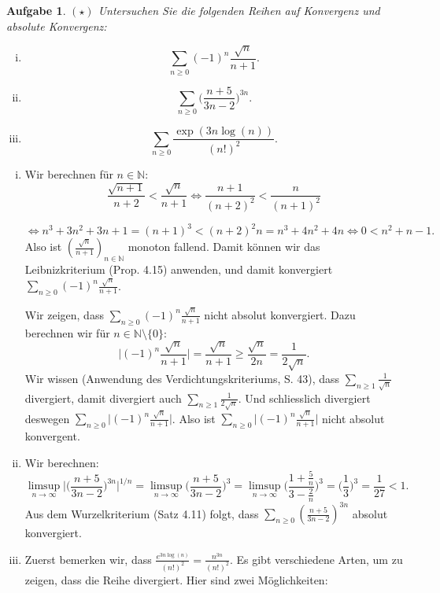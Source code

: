 \documentclass[a4paper, 20]{exam}
\newtheorem{ex}{Aufgabe}
\newcommand\NN{\mathbb{N}}
\begin{document}
 
\begin{ex}{$(\star)$}
Untersuchen Sie die folgenden Reihen auf Konvergenz und absolute Konvergenz:

\begin{enumerate}[i.)]
\item
$$ \sum_{n\geq 0} (-1)^n \frac{\sqrt{n}}{n+1}.$$

\item
$$ \sum_{n\geq 0} \bigg( \frac{n+5}{3n-2} \bigg)^{3n}.$$

\item
$$ \sum_{n\geq 0} \frac{\exp(3n \log(n))}{(n!)^2}.$$
\end{enumerate}
\end{ex}
\begin{solution}
\begin{enumerate}[i.)]
\item
Wir berechnen f\"ur $n\in \NN$:
$$ \frac{\sqrt{n+1}}{n+2} < \frac{\sqrt{n}}{n+1} 
\Longleftrightarrow \frac{n+1}{(n+2)^2} < \frac{n}{(n+1)^2}$$

$$\Longleftrightarrow n^3+3n^2+3n+1= (n+1)^3 < (n+2)^2 n = n^3+4n^2+4n
\Longleftrightarrow 0 < n^2+n-1.$$
Also ist $(\frac{\sqrt{n}}{n+1})_{n \in \NN}$ monoton fallend. Damit k\"onnen wir das Leibnizkriterium (Prop. 4.15) anwenden, und damit konvergiert $ \sum_{n\geq 0} (-1)^n \frac{\sqrt{n}}{n+1}$.

Wir zeigen, dass $ \sum_{n\geq 0} (-1)^n \frac{\sqrt{n}}{n+1}$ nicht absolut konvergiert. Dazu berechnen wir f\"ur $n \in \NN \setminus \{0\}$:
$$ \bigg\vert (-1)^n \frac{\sqrt{n}}{n+1} \bigg\vert = \frac{\sqrt{n}}{n+1}
\geq \frac{\sqrt{n}}{2n} = \frac{1}{2\sqrt{n}}.$$
Wir wissen (Anwendung des Verdichtungskriteriums, S. 43), dass $\sum_{n\geq 1} \frac{1}{\sqrt{n}}$ divergiert, damit divergiert auch $\sum_{n\geq 1} \frac{1}{2\sqrt{n}}$. Und schliesslich divergiert deswegen 
$\sum_{n\geq 0} \bigg\vert (-1)^n \frac{\sqrt{n}}{n+1} \bigg\vert$. Also ist $\sum_{n\geq 0} \bigg\vert (-1)^n \frac{\sqrt{n}}{n+1} \bigg\vert$ nicht absolut konvergent.
\item
Wir berechnen:
$$ \limsup_{n\rightarrow \infty} \bigg\vert \Big( \frac{n+5}{3n-2} \Big)^{3n} \bigg\vert^{1/n} 
= \limsup_{n\rightarrow \infty} \bigg( \frac{n+5}{3n-2} \bigg)^{3}
= \limsup_{n\rightarrow \infty} \bigg( \frac{1+\frac{5}{n}}{3-\frac{2}{n}} \bigg)^{3} = \bigg(\frac{1}{3} \bigg)^3= \frac{1}{27} <1.$$
Aus dem Wurzelkriterium (Satz 4.11) folgt, dass $\sum_{n\geq 0} \left( \frac{n+5}{3n-2} \right)^{3n}$ absolut konvergiert.
\item
Zuerst bemerken wir, dass $\frac{e^{3n \log(n)}}{(n!)^2}= \frac{n^{3n}}{(n!)^2}$. Es gibt verschiedene Arten, um zu zeigen, dass die Reihe divergiert. Hier sind zwei M\"oglichkeiten:


\end{enumerate}
\end{solution}
\end{document}
